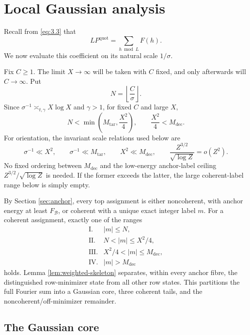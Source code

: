 \section{Local Gaussian analysis}\label{sec:gaussian}

Recall from \eqref{eq:3.3} that
\[
L P^{\mathrm{quot}}=\sum_{h\bmod L}F(h).
\tag{6.1}\label{eq:6.1}
\]
We now evaluate this coefficient on its natural scale $1/\sigma$.

Fix $C\ge1$. The limit $X\to\infty$ will be taken with $C$ fixed, and only afterwards will $C\to\infty$. Put
\[
N=\left\lfloor\frac{C}{\sigma}\right\rfloor.
\tag{6.2}\label{eq:6.2}
\]
Since $\sigma^{-1}\asymp_{t,\gamma}X\log X$ and $\gamma>1$, for fixed $C$ and large $X$,
\[
N<\min\left(M_{\mathrm{tar}},\frac{X^2}{4}\right),
\qquad
\frac{X^2}{4}<M_{\mathrm{dec}}.
\tag{6.3}\label{eq:6.3}
\]
For orientation, the invariant scale relations used below are
\[
\sigma^{-1}\ll X^2,
\qquad
\sigma^{-1}\ll M_{\mathrm{tar}},
\qquad
X^2\ll M_{\mathrm{dec}},
\qquad
\frac{Z^{3/2}}{\sqrt{\log Z}}=o(Z^2).
\]
No fixed ordering between $M_{\mathrm{dec}}$ and the low-energy anchor-label ceiling $Z^{3/2}/\sqrt{\log Z}$ is needed. If the former exceeds the latter, the large coherent-label range below is simply empty.

By Section \ref{sec:anchor}, every top assignment is either noncoherent, with anchor energy at least $F_{\mathcal B}$, or coherent with a unique exact integer label $m$. For a coherent assignment, exactly one of the ranges
\[
\begin{array}{ll}
\mathrm{I}.& |m|\le N,\\
\mathrm{II}.& N<|m|\le X^2/4,\\
\mathrm{III}.& X^2/4<|m|\le M_{\mathrm{dec}},\\
\mathrm{IV}.& |m|>M_{\mathrm{dec}}
\end{array}
\tag{6.4}\label{eq:6.4}
\]
holds. Lemma \ref{lem:weighted-skeleton} separates, within every anchor fibre, the distinguished row-minimizer state from all other row states. This partitions the full Fourier sum into a Gaussian core, three coherent tails, and the noncoherent/off-minimizer remainder.

\subsection{The Gaussian core}

